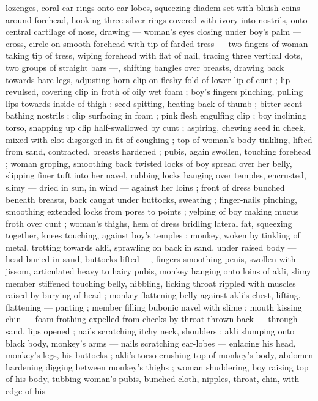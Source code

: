{lozenges, coral ear-rings onto ear-lobes, squeezing diadem set with 
bluish coins around forehead, hooking three silver rings covered with 
ivory into nostrils, onto central cartilage of nose, drawing --- 
woman's eyes closing under boy's palm --- cross, circle on smooth 
forehead with tip of farded tress --- two fingers of woman taking tip 
of tress, wiping forehead with flat of nail, tracing three vertical dots, 
two groups of straight bars ---, shifting bangles over breasts, 
drawing back towards bare legs, adjusting horn clip on fleshy fold of 
lower lip of cunt ; lip revulsed, covering clip in froth of oily wet foam 
; boy's fingers pinching, pulling lips towards inside of thigh : seed 
spitting, heating back of thumb ; bitter scent bathing nostrils ; clip 
surfacing in foam ; pink flesh engulfing clip ; boy inclining torso, 
snapping up clip half-swallowed by cunt ; aspiring, chewing seed in 
cheek, mixed with clot disgorged in fit of coughing ; top of woman's 
body tinkling, lifted from sand, contracted, breasts hardened ; pubis, 
again swollen, touching forehead ; woman groping, smoothing back 
twisted locks of boy spread over her belly, slipping finer tuft into her 
navel, rubbing locks hanging over temples, encrusted, slimy --- dried 
in sun, in wind --- against her loins ; front of dress bunched beneath 
breasts, back caught under buttocks, sweating ; finger-nails pinching, 
smoothing extended locks from pores to points ; yelping of boy 
making mucus froth over cunt ; woman's thighs, hem of dress 
bridling lateral fat, squeezing together, knees touching, against 
boy's temples ; monkey, woken by tinkling of metal, trotting towards 
akli, sprawling on back in sand, under raised body --- head buried in 
sand, buttocks lifted ---, fingers smoothing penis, swollen with 
jissom, articulated heavy to hairy pubis, monkey hanging onto loins 
of akli, slimy member stiffened touching belly, nibbling, licking throat 
rippled with muscles raised by burying of head ; monkey flattening 
belly against akli's chest, lifting, flattening --- panting ; member 
filling bubonic navel with slime ; mouth kissing chin --- foam frothing 
expelled from cheeks by throat thrown back --- through sand, lips 
opened ; nails scratching itchy neck, shoulders : akli slumping onto 
black body, monkey's arms --- nails scratching ear-lobes --- enlacing 
his head, monkey's legs, his buttocks ; akli's torso crushing top of 
monkey's body, abdomen hardening digging between monkey's 
thighs ; woman shuddering, boy raising top of his body, tubbing 
woman's pubis, bunched cloth, nipples, throat, chin, with edge of his 
}
